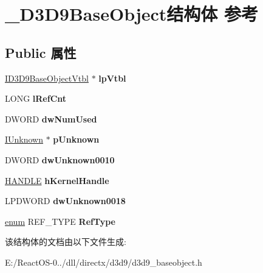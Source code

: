 \hypertarget{struct___d3_d9_base_object}{}\section{\+\_\+\+D3\+D9\+Base\+Object结构体 参考}
\label{struct___d3_d9_base_object}
\subsection*{Public 属性}
\begin{DoxyCompactItemize}
\item 
\mbox{\label{struct___d3_d9_base_object_a96c1a1c8e442aba7cb23bc76c1a97cd2}} 
\hyperlink{struct___d3_d9_base_object_vtbl}{I\+D3\+D9\+Base\+Object\+Vtbl} $\ast$ {\bfseries lp\+Vtbl}
\item 
\mbox{\label{struct___d3_d9_base_object_a62ba22cdf01bffadaaa6485fd65708c8}} 
L\+O\+NG {\bfseries l\+Ref\+Cnt}
\item 
\mbox{\label{struct___d3_d9_base_object_a9800aa0491b43bf24a8e5ddec5ab0948}} 
D\+W\+O\+RD {\bfseries dw\+Num\+Used}
\item 
\mbox{\label{struct___d3_d9_base_object_af023d6f5532abcea24cb34d178790ab0}} 
\hyperlink{interface_i_unknown}{I\+Unknown} $\ast$ {\bfseries p\+Unknown}
\item 
\mbox{\label{struct___d3_d9_base_object_a149192feb5521de3428319a4c5a64515}} 
D\+W\+O\+RD {\bfseries dw\+Unknown0010}
\item 
\mbox{\label{struct___d3_d9_base_object_af65dfe2cac2cb5663958c29dcc33cb36}} 
\hyperlink{interfacevoid}{H\+A\+N\+D\+LE} {\bfseries h\+Kernel\+Handle}
\item 
\mbox{\label{struct___d3_d9_base_object_a9e605b4a7844bc33bd05f4bbca863c93}} 
L\+P\+D\+W\+O\+RD {\bfseries dw\+Unknown0018}
\item 
\mbox{\label{struct___d3_d9_base_object_aa90f0bb480b974dc806a2f4f85da03ad}} 
\hyperlink{interfaceenum}{enum} R\+E\+F\+\_\+\+T\+Y\+PE {\bfseries Ref\+Type}
\end{DoxyCompactItemize}


该结构体的文档由以下文件生成\+:\begin{DoxyCompactItemize}
\item 
E\+:/\+React\+O\+S-\/0../dll/directx/d3d9/d3d9\+\_\+baseobject.\+h\end{DoxyCompactItemize}
